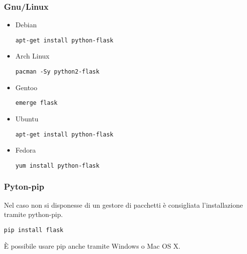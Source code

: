 \documentclass[12pt]{scrartcl}
\begin{document}
    \subsubsection{Gnu/Linux}
        \begin{itemize}
            \item Debian
            \begin{verbatim}
apt-get install python-flask
            \end{verbatim}
            \item Arch Linux
            \begin{verbatim}
pacman -Sy python2-flask
            \end{verbatim}
            \item Gentoo
            \begin{verbatim}
emerge flask
            \end{verbatim}
            \item Ubuntu
            \begin{verbatim}
apt-get install python-flask
            \end{verbatim}
            \item Fedora
             \begin{verbatim}
yum install python-flask
            \end{verbatim}
        \end{itemize}
        
        \subsubsection{Pyton-pip}
        Nel caso non si disponesse di un gestore di pacchetti \`e consigliata l'installazione
        tramite python-pip.
        \begin{verbatim}
pip install flask
        \end{verbatim}
        \`E possibile usare pip anche tramite Windows o Mac OS X.
\end{document}
